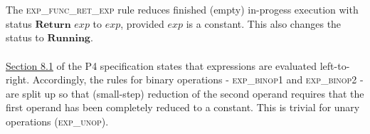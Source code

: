 \documentclass[UTF8]{article}
\begin{document}
\\~\\
The \textsc{exp\_func\_ret\_exp} rule reduces finished (empty) in-progess execution with status $\mathbf{Return} \,\, \mathit{exp}$ to $\mathit{exp}$, provided $\mathit{exp}$ is a constant. This also changes the status to $\mathbf{Running}$.
\\~\\
\href{https://p4.org/p4-spec/docs/P4-16-v1.2.1.html#sec-expr-eval-order}{Section 8.1} of the P4 specification states that expressions are evaluated left-to-right. Accordingly, the rules for binary operations - \textsc{exp\_binop1} and \textsc{exp\_binop2} - are split up so that (small-step) reduction of the second operand requires that the first operand has been completely reduced to a constant. This is trivial for unary operations (\textsc{exp\_unop}).

\newpage
\end{document}
